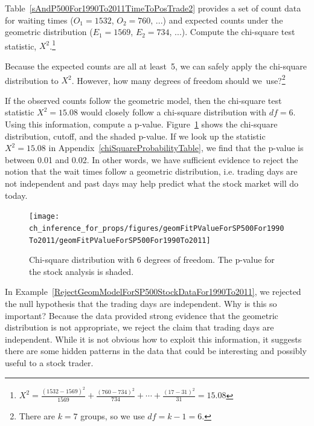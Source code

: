 \begin{exercise}
Table~\ref{sAndP500For1990To2011TimeToPosTrade2} provides a set of count data for waiting times ($O_1=1532$, $O_2=760$, ...) and expected counts under the geometric distribution ($E_1=1569$, $E_2=734$, ...). Compute the chi-square test statistic, $X^2$.\footnote{$X^2=\frac{(1532-1569)^2}{1569} + \frac{(760-734)^2}{734} + \cdots + \frac{(17-31)^2}{31} = 15.08$}
\end{exercise}

\begin{exercise}
Because the expected counts are all at least~5, we can safely apply the chi-square distribution to $X^2$. However, how many degrees of freedom should we~use?\footnote{There are $k=7$ groups, so we use $df=k-1=6$.}
\end{exercise}

\begin{example}{If the observed counts follow the geometric model, then the chi-square test statistic $X^2=15.08$ would closely follow a chi-square distribution with $df=6$. Using this information, compute a p-value.} \label{RejectGeomModelForSP500StockDataFor1990To2011}
Figure~\ref{geomFitPValueForSP500For1990To2011} shows the chi-square distribution, cutoff, and the shaded p-value. If we look up the statistic $X^2=15.08$ in Appendix~\ref{chiSquareProbabilityTable}, we find that the p-value is between 0.01 and 0.02. In other words, we have sufficient evidence to reject the notion that the wait times follow a geometric distribution, i.e. trading days are not independent and past days may help predict what the stock market will do today.
\end{example}

\begin{figure}
\centering
\texttt{[image: ch\_inference\_for\_props/figures/geomFitPValueForSP500For1990To2011/geomFitPValueForSP500For1990To2011]}
\caption{Chi-square distribution with 6 degrees of freedom. The p-value for the stock analysis is shaded.}
\label{geomFitPValueForSP500For1990To2011}
\end{figure}

\begin{example}{In Example~\ref{RejectGeomModelForSP500StockDataFor1990To2011}, we rejected the null hypothesis that the trading days are independent. Why is this so important?}
Because the data provided strong evidence that the geometric distribution is not appropriate, we reject the claim that trading days are independent. While it is not obvious how to exploit this information, it suggests there are some hidden patterns in the data that could be interesting and possibly useful to a stock trader.
\end{example}

